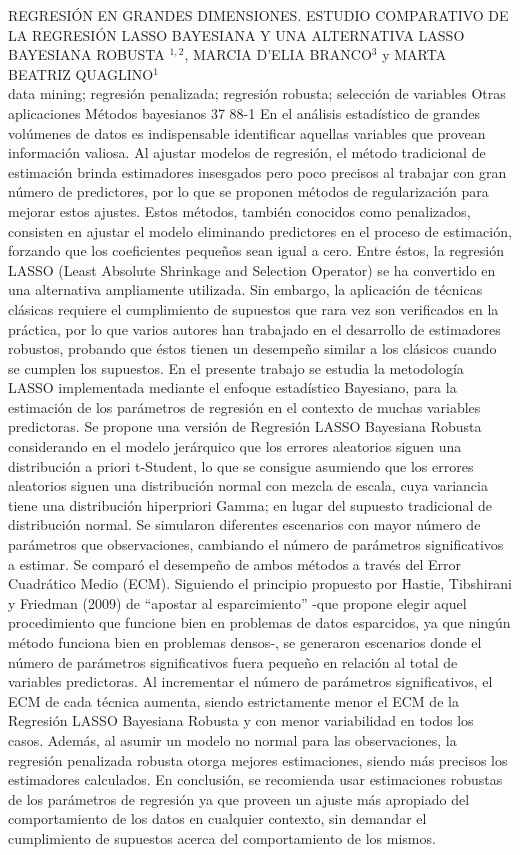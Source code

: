 \A
{REGRESIÓN EN GRANDES DIMENSIONES. ESTUDIO COMPARATIVO DE LA REGRESIÓN LASSO BAYESIANA Y UNA ALTERNATIVA LASSO BAYESIANA ROBUSTA}
{$^{1,2}$, MARCIA D'ELIA BRANCO$^3$ y MARTA BEATRIZ QUAGLINO$^1$}
{
\\}
{data mining; regresión penalizada; regresión robusta; selección de variables} 
 {Otras aplicaciones} 
 {Métodos bayesianos} 
 {37} 
 {88-1}
{En el análisis estadístico de grandes volúmenes de datos es indispensable identificar aquellas variables que provean información valiosa. Al ajustar modelos de regresión, el método tradicional de estimación brinda estimadores insesgados pero poco precisos al trabajar con gran número de predictores, por lo que se proponen métodos de regularización para mejorar estos ajustes. Estos métodos, también conocidos como penalizados, consisten en ajustar el modelo eliminando predictores en el proceso de estimación, forzando que los coeficientes pequeños sean igual a cero. Entre éstos, la regresión LASSO (Least Absolute Shrinkage and Selection Operator) se ha convertido en una alternativa ampliamente utilizada. Sin embargo, la aplicación de técnicas clásicas requiere el cumplimiento de supuestos que rara vez son verificados en la práctica, por lo que varios autores han trabajado en el desarrollo de estimadores robustos, probando que éstos tienen un desempeño similar a los clásicos cuando se cumplen los supuestos. En el presente trabajo se estudia la metodología LASSO implementada mediante el enfoque estadístico Bayesiano, para la estimación de los parámetros de regresión en el contexto de muchas variables predictoras. Se propone una versión de Regresión LASSO Bayesiana Robusta considerando en el modelo jerárquico que los errores aleatorios siguen una distribución a priori t-Student, lo que se consigue asumiendo que los errores aleatorios siguen una distribución normal con mezcla de escala, cuya variancia tiene una distribución hiperpriori Gamma; en lugar del supuesto tradicional de distribución normal. Se simularon diferentes escenarios con mayor número de parámetros que observaciones, cambiando el número de parámetros significativos a estimar. Se comparó el desempeño de ambos métodos a través del Error Cuadrático Medio (ECM). Siguiendo el principio propuesto por Hastie, Tibshirani y Friedman (2009) de “apostar al esparcimiento” -que propone elegir aquel procedimiento que funcione bien en problemas de datos esparcidos, ya que ningún método funciona bien en problemas densos-, se generaron escenarios donde el número de parámetros significativos fuera pequeño en relación al total de variables predictoras. Al incrementar el número de parámetros significativos, el ECM de cada técnica aumenta, siendo estrictamente menor el ECM de la Regresión LASSO Bayesiana Robusta y con menor variabilidad en todos los casos. Además, al asumir un modelo no normal para las observaciones, la regresión penalizada robusta otorga mejores estimaciones, siendo más precisos los estimadores calculados. En conclusión, se recomienda usar estimaciones robustas de los parámetros de regresión ya que proveen un ajuste más apropiado del comportamiento de los datos en cualquier contexto, sin demandar el cumplimiento de supuestos acerca del comportamiento de los mismos.}
